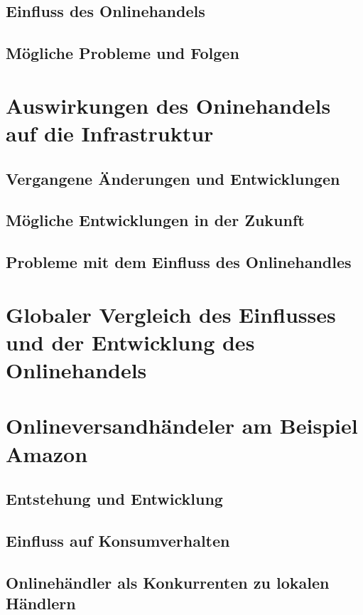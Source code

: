 \documentclass[a4paper, 10pt]{scrartcl}
\begin{document}
        \subsection{Einfluss des Onlinehandels}
        \subsection{Mögliche Probleme und Folgen}
    \newpage
        
    \section{Auswirkungen des Oninehandels auf die Infrastruktur}
        \subsection{Vergangene Änderungen und Entwicklungen}
        \subsection{Mögliche Entwicklungen in der Zukunft}
        \subsection{Probleme mit dem Einfluss des Onlinehandles}
    \newpage
        
    \section{Globaler Vergleich des Einflusses und der Entwicklung des Onlinehandels}
    \newpage
    
    \section{Onlineversandhändeler am Beispiel Amazon}
        \subsection{Entstehung und Entwicklung}
        \subsection{Einfluss auf Konsumverhalten }
        \subsection{Onlinehändler als Konkurrenten zu lokalen Händlern}
    \newpage
        
\end{document}
